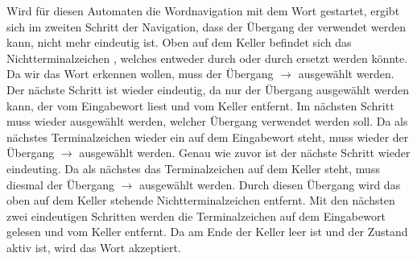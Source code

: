 Wird für diesen Automaten die Wordnavigation mit dem Wort  gestartet,
ergibt sich im zweiten Schritt der Navigation, dass der Übergang der verwendet
werden kann, nicht mehr eindeutig ist. Oben auf dem Keller befindet sich das
Nichtterminalzeichen , welches entweder durch
\TerminalSymbol{$\epsilon$} oder durch
 ersetzt werden könnte. Da
wir das Wort  erkennen wollen, muss der Übergang 
$\to$  ausgewählt werden.
Der nächste Schritt ist wieder eindeutig, da nur der Übergang ausgewählt werden
kann, der  vom Eingabewort liest und  vom
Keller entfernt. Im nächsten Schritt muss wieder ausgewählt werden, welcher
Übergang verwendet werden soll. Da als nächstes Terminalzeichen wieder ein
 auf dem Eingabewort steht, muss wieder der Übergang 
$\to$  ausgewählt werden.
Genau wie zuvor ist der nächste Schritt wieder eindeuting. Da als nächstes das
Terminalzeichen  auf dem Keller steht, muss diesmal der
Übergang  $\to$ \TerminalSymbol{$\epsilon$} ausgewählt werden.
Durch diesen Übergang wird das oben auf dem Keller stehende
Nichtterminalzeichen  entfernt. Mit den nächsten zwei
eindeutigen Schritten werden die Terminalzeichen  auf dem
Eingabewort gelesen und vom Keller entfernt. Da am Ende der Keller leer ist und
der Zustand  aktiv ist, wird das Wort akzeptiert.